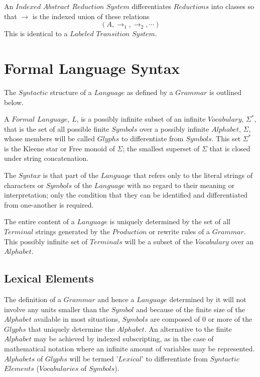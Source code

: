 \documentclass{article}
\begin{document}
An $Indexed$ $Abstract$ $Reduction$ $System$ differentiates
$Reductions$ into classes so that $\rightarrow$ is the indexed union
of these relations
    \[(A, \rightarrow_1, \rightarrow_2, \cdots)\]
This is identical to a $Labeled$ $Transition$ $System$.


\section{Formal Language Syntax}

The $Syntactic$ structure of a $Language$ as defined by a $Grammar$ is
outlined below.

A $Formal$ $Language$, $L$, is a possibly infinite subset of an
infinite $Vocabulary$, $\Sigma^*$, that is the set of all possible
finite $Symbols$ over a possibly infinite $Alphabet$, $\Sigma$, whose
members will be called $Glyphs$ to differentiate from $Symbols$. This
set $\Sigma^*$ is the Kleene star or Free monoid of $\Sigma$; the
smallest superset of $\Sigma$ that is closed under string
concatenation.

The $Syntax$ is that part of the $Language$ that refers only to the
literal strings of characters or $Symbols$ of the $Language$ with no
regard to their meaning or interpretation; only the condition that
they can be identified and differentiated from one-another is
required.

The entire content of a $Language$ is uniquely determined by the set
of all $Terminal$ strings generated by the $Production$ or rewrite
rules of a $Grammar$. This possibly infinite set of $Terminals$ will
be a subset of the $Vocabulary$ over an $Alphabet$.


\subsection{Lexical Elements}

The definition of a $Grammar$ and hence a $Language$ determined by it
will not involve any units smaller than the $Symbol$ and because of
the finite size of the $Alphabet$ available in most situations,
$Symbols$ are composed of 0 or more of the $Glyphs$ that uniquely
determine the $Alphabet$. An alternative to the finite $Alphabet$ may
be achieved by indexed subscripting, as in the case of mathematical
notation where an infinite amount of variables may be
represented. $Alphabets$ of $Glyphs$ will be termed '$Lexical$' to
differentiate from $Syntactic$ $Elements$ ($Vocabularies$ of
$Symbols$).
\end{document}
